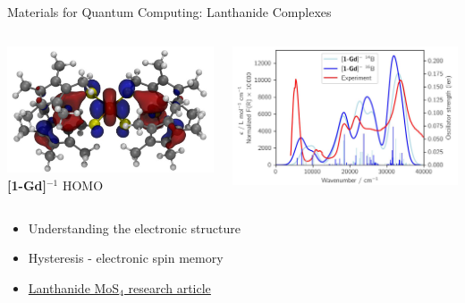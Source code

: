 \documentclass[11pt]{beamer}
\begin{document}
\begin{frame}{Materials for Quantum Computing: Lanthanide Complexes}
  \begin{columns}
    \centering
    \includegraphics[scale=0.15]{gd_homo}
    \textbf{[1-Gd]$^{-1}$} HOMO
    
    \centering
    \includegraphics[scale=0.14]{gd_uv}
  \end{columns}

  \begin{itemize}
  \item Understanding the electronic structure
  \item Hysteresis - electronic spin memory
  \item \href{https://pubs.acs.org/doi/10.1021/jacs.1c03098}
    {Lanthanide MoS$_4$ research article}
  \end{itemize}
\end{frame}
\end{document}
